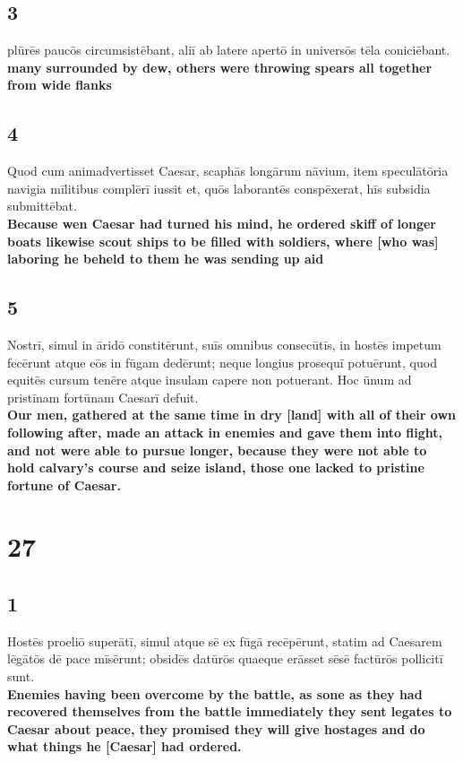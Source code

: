 \documentclass{article}
\begin{document}
\subsection*{3}
plūrēs paucōs circumsistēbant, aliī ab latere apertō in universōs tēla coniciēbant.\\
\textbf{many surrounded by dew, others were throwing spears all together from wide flanks}

\subsection*{4}
Quod cum animadvertisset Caesar, scaphās longārum nāvium, item speculātōria navigia mīlitibus complērī iussit et, quōs laborantēs conspēxerat, hīs subsidia submittēbat. \\
\textbf{Because wen Caesar had turned his mind, he ordered skiff of longer boats likewise scout ships to be filled with soldiers, where [who was] laboring he beheld to them he was sending up aid}

\subsection*{5}
Nostrī, simul in āridō constitērunt, suīs omnibus consecūtīs, in hostēs impetum fecērunt atque eōs in fūgam dedērunt; neque longius prosequī potuērunt, quod equitēs cursum tenēre atque insulam capere non potuerant. Hoc ūnum ad pristīnam fortūnam Caesarī defuit.\\
\textbf{Our men, gathered at the same time in dry [land] with all of their own following after, made an attack in enemies and gave them into flight, and not were able to pursue longer, because they were not able to hold calvary's course and seize island, those one lacked to pristine fortune of Caesar.}






\section*{27}
\subsection*{1}
Hostēs proeliō superātī, simul atque sē ex fūgā recēpērunt, statim ad Caesarem lēgātōs dē pace mīsērunt; obsidēs datūrōs quaeque erāsset sēsē factūrōs pollicitī sunt. \\
\textbf{Enemies having been overcome by the battle, as sone as they had recovered themselves from the battle immediately they sent legates to Caesar about peace, they promised they will give hostages and do what things he [Caesar] had ordered.}
\end{document}
